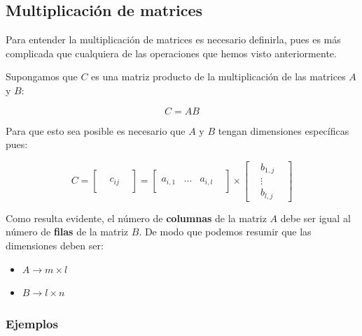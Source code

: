\documentclass[
]{book}
\providecommand{\tightlist}{%
  \setlength{\itemsep}{0pt}\setlength{\parskip}{0pt}}
\begin{document}
\hypertarget{multiplicaciuxf3n-de-matrices}{%
\subsection{Multiplicación de matrices}\label{multiplicaciuxf3n-de-matrices}}

Para entender la multiplicación de matrices es necesario definirla, pues es más complicada que cualquiera de las operaciones que hemos visto anteriormente.

Supongamos que \(C\) es una matriz producto de la multiplicación de las matrices \(A\) y \(B\):

\[C = AB\]

Para que esto sea posible es necesario que \(A\) y \(B\) tengan dimensiones específicas pues:

\begin{equation}
C = \left[
\begin{array}{rrr}
 &        & \\
 & c_{ij} & \\
 &        &
\end{array}
\right] =
\left[ 
\begin{array}{ccc}
 & & & \\
a_{i, 1} & \dots & a_{i, l} \\
 & & &
\end{array}
\right] \times
\left[ 
\begin{array}{ccc}
 & b_{1, j} & \\
 & \vdots & \\
 & b_{l, j} & 
\end{array}
\right] \label{eq:mat-mult}
\end{equation}

Como resulta evidente, el número de \textbf{columnas} de la matriz \(A\) debe ser igual al número de \textbf{filas} de la matriz \(B\). De modo que podemos resumir que las dimensiones deben ser:

\begin{itemize}
\tightlist
\item
  \(A \rightarrow m \times l\)
\item
  \(B \rightarrow l \times n\)
\end{itemize}

\hypertarget{ejemplos}{%
\subsubsection{Ejemplos}\label{ejemplos}}
\end{document}
